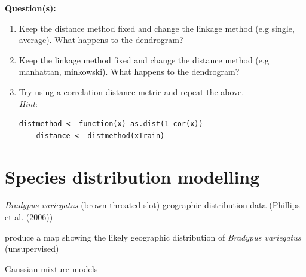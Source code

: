 \documentclass[a4paper,11pt]{article}
\begin{document}
\begin{framed}
\textbf{Question(s):}
\begin{enumerate}
	\item Keep the distance method fixed and change the linkage method (e.g single, average). What happens to the dendrogram? 
	\item Keep the linkage method fixed and change the distance method (e.g manhattan, minkowski). What happens to the dendrogram?
	\item Try using a correlation distance metric and repeat the above. 
	\\
	\textit{Hint}:
	\begin{lstlisting}[style=RCode, backgroundcolor=\color{white}]
	distmethod <- function(x) as.dist(1-cor(x))
	distance <- distmethod(xTrain)
	\end{lstlisting}
	\vspace{-0.5cm} %
\end{enumerate}
\end{framed}

\clearpage
\section{Species distribution modelling}
\begin{framed}
\begin{description}[leftmargin=5em,style=nextline]\addtolength{\itemsep}{-0.2\baselineskip}
	\item[Data:] \textit{Bradypus variegatus} (brown-throated slot) geographic distribution data (\href{http://www.cs.princeton.edu/~schapire/maxent/}{Phillips et al. (2006)})	
	\item[Task:] produce a map showing the likely geographic distribution of \textit{Bradypus variegatus} (unsupervised)
	\item[Method:] Gaussian mixture models
\end{description} 
\end{framed}
\end{document}
